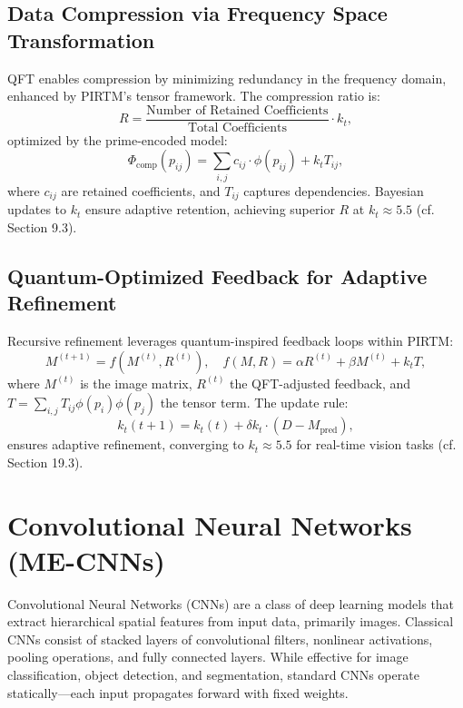 \documentclass{article}
\theoremstyle{plain}
\begin{document}
\subsection{Data Compression via Frequency Space Transformation}
QFT enables compression by minimizing redundancy in the frequency domain, enhanced by PIRTM’s tensor framework. The compression ratio is:
\begin{equation}
R = \frac{\text{Number of Retained Coefficients}}{\text{Total Coefficients}} \cdot k_t,
\end{equation}
optimized by the prime-encoded model:
\begin{equation}
\Phi_\text{comp}(p_{ij}) = \sum_{i,j} c_{ij} \cdot \phi(p_{ij}) + k_t T_{ij},
\end{equation}
where \( c_{ij} \) are retained coefficients, and \( T_{ij} \) captures dependencies. Bayesian updates to \( k_t \) ensure adaptive retention, achieving superior \( R \) at \( k_t \approx 5.5 \) (cf. Section 9.3).

\subsection{Quantum-Optimized Feedback for Adaptive Refinement}
Recursive refinement leverages quantum-inspired feedback loops within PIRTM:
\begin{equation}
M^{(t+1)} = f(M^{(t)}, R^{(t)}), \quad f(M, R) = \alpha R^{(t)} + \beta M^{(t)} + k_t T,
\end{equation}
where \( M^{(t)} \) is the image matrix, \( R^{(t)} \) the QFT-adjusted feedback, and \( T = \sum_{i,j} T_{ij} \phi(p_i) \phi(p_j) \) the tensor term. The update rule:
\begin{equation}
k_t(t+1) = k_t(t) + \delta k_t \cdot (D - M_\text{pred}),
\end{equation}
ensures adaptive refinement, converging to \( k_t \approx 5.5 \) for real-time vision tasks (cf. Section 19.3).


\section{Convolutional Neural Networks (ME-CNNs)}

Convolutional Neural Networks (CNNs) are a class of deep learning models that extract hierarchical spatial features from input data, primarily images. Classical CNNs consist of stacked layers of convolutional filters, nonlinear activations, pooling operations, and fully connected layers. While effective for image classification, object detection, and segmentation, standard CNNs operate statically—each input propagates forward with fixed weights.
\end{document}
